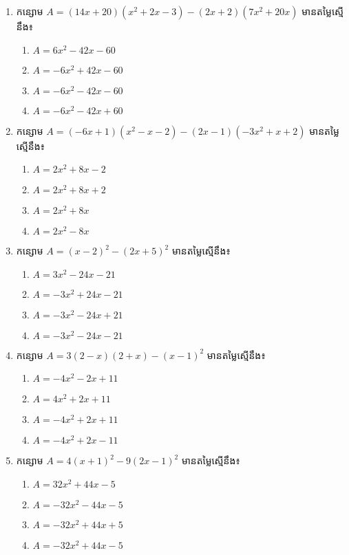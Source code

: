 \begin{enumerate}
\item កន្សោម $A=(14x+20)(x^2+2x-3)-(2x+2)(7x^2+20x)$ មានតម្លៃស្មើនឹង៖
\begin{multicols}{2}
\begin{enumerate}[label=\alph*.]
\item $A=6x^2-42x-60$
\item $A=-6x^2+42x-60$
\item $A=-6x^2-42x-60$
\item $A=-6x^2-42x+60$
\end{enumerate}
\end{multicols}

\item កន្សោម $A=(-6x+1)(x^2-x-2)-(2x-1)(-3x^2+x+2)$ មានតម្លៃស្មើនឹង៖
\begin{multicols}{2}
\begin{enumerate}[label=\alph*.]
\item $A=2x^2+8x-2$
\item $A=2x^2+8x+2$
\item $A=2x^2+8x$
\item $A=2x^2-8x$
\end{enumerate}
\end{multicols}

\item កន្សោម $A=(x-2)^2-(2x+5)^2$ មានតម្លៃស្មើនឹង៖
\begin{multicols}{2}
\begin{enumerate}[label=\alph*.]
\item $A=3x^2-24x-21$
\item $A=-3x^2+24x-21$
\item $A=-3x^2-24x+21$
\item $A=-3x^2-24x-21$
\end{enumerate}
\end{multicols}

\item កន្សោម $A=3(2-x)(2+x)-(x-1)^2$ មានតម្លៃស្មើនឹង៖
\begin{multicols}{2}
\begin{enumerate}[label=\alph*.]
\item $A=-4x^2-2x+11$
\item $A=4x^2+2x+11$
\item $A=-4x^2+2x+11$
\item $A=-4x^2+2x-11$
\end{enumerate}
\end{multicols}

\item កន្សោម $A=4(x+1)^2-9(2x-1)^2$ មានតម្លៃស្មើនឹង៖
\begin{multicols}{2}
\begin{enumerate}[label=\alph*.]
\item $A=32x^2+44x-5$
\item $A=-32x^2-44x-5$
\item $A=-32x^2+44x+5$
\item $A=-32x^2+44x-5$
\end{enumerate}
\end{multicols}


\end{enumerate}
